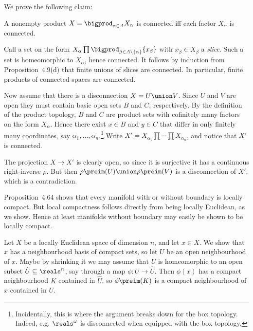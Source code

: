 \documentclass[article, a4paper, 11pt, oneside]{memoir}
\numberwithin{equation}{chapter}
\theoremstyle{nonumberplain}
\newenvironment{displaytheorem}{%
	\begin{displayquote}\itshape%
}{%
	\end{displayquote}%
}
\begin{document}
\begin{remarkbreak}
    We prove the following claim:
    \begin{displaytheorem}
        A nonempty product $X = \bigprod_{\alpha \in A} X_\alpha$ is connected iff each factor $X_\alpha$ is connected.
    \end{displaytheorem}
    Call a set on the form $X_\alpha \prod \bigprod_{\beta \in A \setminus \{\alpha\}} \{x_\beta\}$ with $x_\beta \in X_\beta$ a \emph{slice}. Such a set is homeomorphic to $X_\alpha$, hence connected. It follows by induction from Proposition~4.9(d) that finite unions of slices are connected. In particular, finite products of connected spaces are connected.

    Now assume that there is a disconnection $X = U \union V$. Since $U$ and $V$ are open they must contain basic open sets $B$ and $C$, respectively. By the definition of the product topology, $B$ and $C$ are product sets with cofinitely many factors on the form $X_\alpha$. Hence there exist $x \in B$ and $y \in C$ that differ in only finitely many coordinates, say $\alpha_1, \ldots, \alpha_n$.\footnote{Incidentally, this is where the argument breaks down for the box topology. Indeed, e.g. $\reals^\omega$ is disconnected when equipped with the box topology.} Write $X' = X_{\alpha_1} \prod \cdots \prod X_{\alpha_n}$, and notice that $X'$ is connected.

    The projection $X \to X'$ is clearly open, so since it is surjective it has a continuous right-inverse $\rho$. But then $\rho\preim(U) \union \rho\preim(V)$ is a disconnection of $X'$, which is a contradiction.
\end{remarkbreak}


\begin{remarkbreak}
    Proposition~4.64 shows that every manifold with or without boundary is locally compact. But local compactness follows directly from being locally Euclidean, as we show. Hence at least manifolds without boundary may easily be shown to be locally compact.

    Let $X$ be a locally Euclidean space of dimension $n$, and let $x \in X$. We show that $x$ has a neighbourhood basis of compact sets, so let $U$ be an open neighbourhood of $x$. Maybe by shrinking it we may assume that $U$ is homeomorphic to an open subset $\hat{U} \subseteq \reals^n$, say through a map $\phi \colon U \to \hat{U}$. Then $\phi(x)$ has a compact neighbourhood $K$ contained in $\hat{U}$, so $\phi\preim(K)$ is a compact neighbourhood of $x$ contained in $U$.
\end{remarkbreak}
\end{document}
